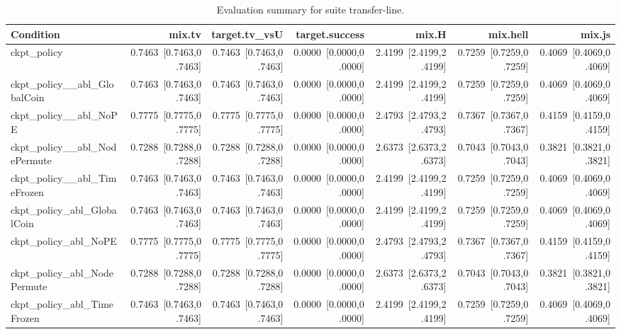 \begin{table}[t]
\centering
\caption{Evaluation summary for suite transfer-line.}
\label{tab:eval_transfer-line}
\begin{tabular}{lrrrrrr}
\toprule
Condition & mix.tv & target.tv\_vsU & target.success & mix.H & mix.hell & mix.js \\
\midrule
ckpt\_policy & 0.7463~[0.7463,0.7463] & 0.7463~[0.7463,0.7463] & 0.0000~[0.0000,0.0000] & 2.4199~[2.4199,2.4199] & 0.7259~[0.7259,0.7259] & 0.4069~[0.4069,0.4069] \\
ckpt\_policy\_\_abl\_GlobalCoin & 0.7463~[0.7463,0.7463] & 0.7463~[0.7463,0.7463] & 0.0000~[0.0000,0.0000] & 2.4199~[2.4199,2.4199] & 0.7259~[0.7259,0.7259] & 0.4069~[0.4069,0.4069] \\
ckpt\_policy\_\_abl\_NoPE & 0.7775~[0.7775,0.7775] & 0.7775~[0.7775,0.7775] & 0.0000~[0.0000,0.0000] & 2.4793~[2.4793,2.4793] & 0.7367~[0.7367,0.7367] & 0.4159~[0.4159,0.4159] \\
ckpt\_policy\_\_abl\_NodePermute & 0.7288~[0.7288,0.7288] & 0.7288~[0.7288,0.7288] & 0.0000~[0.0000,0.0000] & 2.6373~[2.6373,2.6373] & 0.7043~[0.7043,0.7043] & 0.3821~[0.3821,0.3821] \\
ckpt\_policy\_\_abl\_TimeFrozen & 0.7463~[0.7463,0.7463] & 0.7463~[0.7463,0.7463] & 0.0000~[0.0000,0.0000] & 2.4199~[2.4199,2.4199] & 0.7259~[0.7259,0.7259] & 0.4069~[0.4069,0.4069] \\
ckpt\_policy\_abl\_GlobalCoin & 0.7463~[0.7463,0.7463] & 0.7463~[0.7463,0.7463] & 0.0000~[0.0000,0.0000] & 2.4199~[2.4199,2.4199] & 0.7259~[0.7259,0.7259] & 0.4069~[0.4069,0.4069] \\
ckpt\_policy\_abl\_NoPE & 0.7775~[0.7775,0.7775] & 0.7775~[0.7775,0.7775] & 0.0000~[0.0000,0.0000] & 2.4793~[2.4793,2.4793] & 0.7367~[0.7367,0.7367] & 0.4159~[0.4159,0.4159] \\
ckpt\_policy\_abl\_NodePermute & 0.7288~[0.7288,0.7288] & 0.7288~[0.7288,0.7288] & 0.0000~[0.0000,0.0000] & 2.6373~[2.6373,2.6373] & 0.7043~[0.7043,0.7043] & 0.3821~[0.3821,0.3821] \\
ckpt\_policy\_abl\_TimeFrozen & 0.7463~[0.7463,0.7463] & 0.7463~[0.7463,0.7463] & 0.0000~[0.0000,0.0000] & 2.4199~[2.4199,2.4199] & 0.7259~[0.7259,0.7259] & 0.4069~[0.4069,0.4069] \\
\bottomrule
\end{tabular}
\end{table}
